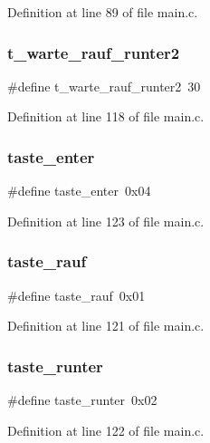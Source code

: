Definition at line 89 of file main.\+c.

\mbox{\label{main_8c_a31cb589e462e21c22e3958748e5fd0a1}} 
\subsubsection{t\+\_\+warte\+\_\+rauf\+\_\+runter2}
{\footnotesize\ttfamily \#define t\+\_\+warte\+\_\+rauf\+\_\+runter2~30}



Definition at line 118 of file main.\+c.

\mbox{\label{main_8c_afd6a7420e0901304cacd760fba2cbb6f}} 
\subsubsection{taste\+\_\+enter}
{\footnotesize\ttfamily \#define taste\+\_\+enter~0x04}



Definition at line 123 of file main.\+c.

\mbox{\label{main_8c_ab6b09ab9aafe03943dab718335dc474b}} 
\subsubsection{taste\+\_\+rauf}
{\footnotesize\ttfamily \#define taste\+\_\+rauf~0x01}



Definition at line 121 of file main.\+c.

\mbox{\label{main_8c_a66be6aba0c6b60508bc8beaff40c067c}} 
\subsubsection{taste\+\_\+runter}
{\footnotesize\ttfamily \#define taste\+\_\+runter~0x02}



Definition at line 122 of file main.\+c.



